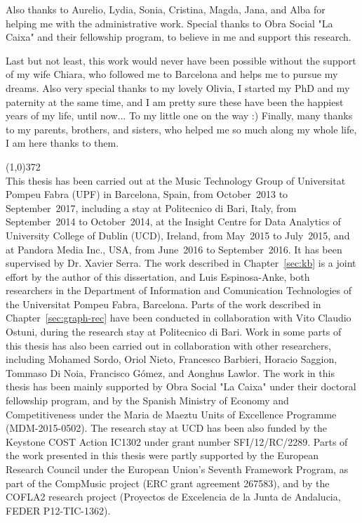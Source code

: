 Also thanks to Aurelio, Lydia, Sonia, Cristina, Magda, Jana, and Alba for helping me with the administrative work.
Special thanks to Obra Social "La Caixa" and their fellowship program, to believe in me and support this research.

Last but not least, this work would never have been possible without the support of my wife Chiara, who followed me to Barcelona and helps me to pursue my dreams. Also very special thanks to my lovely Olivia, I started my PhD and my paternity at the same time, and I am pretty sure these have been the happiest years of my life, until now... To my little one on the way :) Finally, many thanks to my parents, brothers, and sisters, who helped me so much along my whole life, I am here thanks to them.

\vspace*{\fill}

\line(1,0){372}\\
\footnotesize
This thesis has been carried out at the Music Technology Group of Universitat Pompeu Fabra (UPF) in Barcelona, Spain, from October~2013 to September~2017, including a stay at Politecnico di Bari, Italy, from September~2014 to October~2014, at the Insight Centre for Data Analytics of University College of Dublin (UCD), Ireland, from May~2015 to July~2015, and at Pandora Media Inc., USA, from June~2016 to September~2016. It has been supervised by Dr. Xavier Serra.
The work described in Chapter~\ref{sec:kb} is a joint effort by the author of this dissertation, and Luis Espinosa-Anke, both researchers in the Department of Information and Comunication Technologies of the Universitat Pompeu Fabra, Barcelona. 
Parts of the work described in Chapter~\ref{sec:graph-rec} have been conducted in collaboration with Vito Claudio Ostuni, during the research stay at Politecnico di Bari. 
Work in some parts of this thesis has also been carried out in collaboration with other researchers, including Mohamed Sordo, Oriol Nieto, Francesco Barbieri, Horacio Saggion, Tommaso Di Noia, Francisco Gómez, and Aonghus Lawlor. 
The work in this thesis has been mainly supported by Obra Social "La Caixa" under their doctoral fellowship program, and by the Spanish Ministry of Economy and Competitiveness under the Maria de Maeztu Units of Excellence Programme (MDM-2015-0502). The research stay at UCD has been also funded by the Keystone COST Action IC1302 under grant number SFI/12/RC/2289. Parts of the work presented in this thesis were partly supported by the European Research Council under the European Union's Seventh Framework Program, as part of the CompMusic project (ERC grant agreement 267583), and by the COFLA2 research project (Proyectos de Excelencia de la Junta de Andalucia, FEDER P12-TIC-1362).
\normalsize